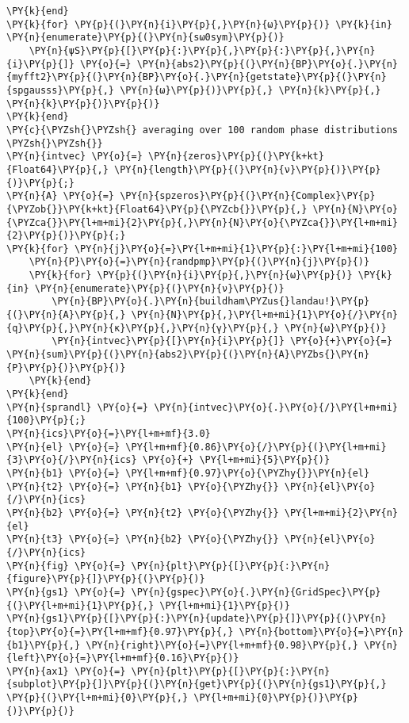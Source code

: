 \begin{Verbatim}[commandchars=\\\{\}]
\PY{k}{end}
\PY{k}{for} \PY{p}{(}\PY{n}{i}\PY{p}{,}\PY{n}{ω}\PY{p}{)} \PY{k}{in} \PY{n}{enumerate}\PY{p}{(}\PY{n}{sω0sym}\PY{p}{)}
    \PY{n}{ψS}\PY{p}{[}\PY{p}{:}\PY{p}{,}\PY{p}{:}\PY{p}{,}\PY{n}{i}\PY{p}{]} \PY{o}{=} \PY{n}{abs2}\PY{p}{(}\PY{n}{BP}\PY{o}{.}\PY{n}{myfft2}\PY{p}{(}\PY{n}{BP}\PY{o}{.}\PY{n}{getstate}\PY{p}{(}\PY{n}{spgausss}\PY{p}{,} \PY{n}{ω}\PY{p}{)}\PY{p}{,} \PY{n}{k}\PY{p}{,} \PY{n}{k}\PY{p}{)}\PY{p}{)}
\PY{k}{end}
\PY{c}{\PYZsh{}\PYZsh{} averaging over 100 random phase distributions \PYZsh{}\PYZsh{}}
\PY{n}{intvec} \PY{o}{=} \PY{n}{zeros}\PY{p}{(}\PY{k+kt}{Float64}\PY{p}{,} \PY{n}{length}\PY{p}{(}\PY{n}{ν}\PY{p}{)}\PY{p}{)}\PY{p}{;}
\PY{n}{A} \PY{o}{=} \PY{n}{spzeros}\PY{p}{(}\PY{n}{Complex}\PY{p}{\PYZob{}}\PY{k+kt}{Float64}\PY{p}{\PYZcb{}}\PY{p}{,} \PY{n}{N}\PY{o}{\PYZca{}}\PY{l+m+mi}{2}\PY{p}{,}\PY{n}{N}\PY{o}{\PYZca{}}\PY{l+m+mi}{2}\PY{p}{)}\PY{p}{;}
\PY{k}{for} \PY{n}{j}\PY{o}{=}\PY{l+m+mi}{1}\PY{p}{:}\PY{l+m+mi}{100}
    \PY{n}{P}\PY{o}{=}\PY{n}{randpmp}\PY{p}{(}\PY{n}{j}\PY{p}{)}
    \PY{k}{for} \PY{p}{(}\PY{n}{i}\PY{p}{,}\PY{n}{ω}\PY{p}{)} \PY{k}{in} \PY{n}{enumerate}\PY{p}{(}\PY{n}{ν}\PY{p}{)}
        \PY{n}{BP}\PY{o}{.}\PY{n}{buildham\PYZus{}landau!}\PY{p}{(}\PY{n}{A}\PY{p}{,} \PY{n}{N}\PY{p}{,}\PY{l+m+mi}{1}\PY{o}{/}\PY{n}{q}\PY{p}{,}\PY{n}{κ}\PY{p}{,}\PY{n}{γ}\PY{p}{,} \PY{n}{ω}\PY{p}{)}
        \PY{n}{intvec}\PY{p}{[}\PY{n}{i}\PY{p}{]} \PY{o}{+}\PY{o}{=} \PY{n}{sum}\PY{p}{(}\PY{n}{abs2}\PY{p}{(}\PY{n}{A}\PYZbs{}\PY{n}{P}\PY{p}{)}\PY{p}{)}
    \PY{k}{end}
\PY{k}{end}
\PY{n}{sprandl} \PY{o}{=} \PY{n}{intvec}\PY{o}{.}\PY{o}{/}\PY{l+m+mi}{100}\PY{p}{;}
\PY{n}{ics}\PY{o}{=}\PY{l+m+mf}{3.0}
\PY{n}{el} \PY{o}{=} \PY{l+m+mf}{0.86}\PY{o}{/}\PY{p}{(}\PY{l+m+mi}{3}\PY{o}{/}\PY{n}{ics} \PY{o}{+} \PY{l+m+mi}{5}\PY{p}{)}
\PY{n}{b1} \PY{o}{=} \PY{l+m+mf}{0.97}\PY{o}{\PYZhy{}}\PY{n}{el}
\PY{n}{t2} \PY{o}{=} \PY{n}{b1} \PY{o}{\PYZhy{}} \PY{n}{el}\PY{o}{/}\PY{n}{ics}
\PY{n}{b2} \PY{o}{=} \PY{n}{t2} \PY{o}{\PYZhy{}} \PY{l+m+mi}{2}\PY{n}{el}
\PY{n}{t3} \PY{o}{=} \PY{n}{b2} \PY{o}{\PYZhy{}} \PY{n}{el}\PY{o}{/}\PY{n}{ics}
\PY{n}{fig} \PY{o}{=} \PY{n}{plt}\PY{p}{[}\PY{p}{:}\PY{n}{figure}\PY{p}{]}\PY{p}{(}\PY{p}{)}
\PY{n}{gs1} \PY{o}{=} \PY{n}{gspec}\PY{o}{.}\PY{n}{GridSpec}\PY{p}{(}\PY{l+m+mi}{1}\PY{p}{,} \PY{l+m+mi}{1}\PY{p}{)}
\PY{n}{gs1}\PY{p}{[}\PY{p}{:}\PY{n}{update}\PY{p}{]}\PY{p}{(}\PY{n}{top}\PY{o}{=}\PY{l+m+mf}{0.97}\PY{p}{,} \PY{n}{bottom}\PY{o}{=}\PY{n}{b1}\PY{p}{,} \PY{n}{right}\PY{o}{=}\PY{l+m+mf}{0.98}\PY{p}{,} \PY{n}{left}\PY{o}{=}\PY{l+m+mf}{0.16}\PY{p}{)}
\PY{n}{ax1} \PY{o}{=} \PY{n}{plt}\PY{p}{[}\PY{p}{:}\PY{n}{subplot}\PY{p}{]}\PY{p}{(}\PY{n}{get}\PY{p}{(}\PY{n}{gs1}\PY{p}{,} \PY{p}{(}\PY{l+m+mi}{0}\PY{p}{,} \PY{l+m+mi}{0}\PY{p}{)}\PY{p}{)}\PY{p}{)}

\end{Verbatim}
